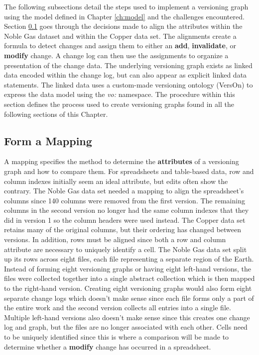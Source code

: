 The following subsections detail the steps used to implement a versioning graph using the model defined in Chapter \ref{ch:model} and the challenges encountered.
Section \ref{mapping} goes through the decisions made to align the attributes within the Noble Gas dataset and within the Copper data set.
The alignments create a formula to detect changes and assign them to either an \textbf{add}, \textbf{invalidate}, or \textbf{modify} change.
A change log can then use the assignments to organize a presentation of the change data.
The underlying versioning graph exists as linked data encoded within the change log, but can also appear as explicit linked data statements.
The linked data uses a custom-made versioning ontology (VersOn) to express the data model using the \textit{vo:} namespace.
The procedure within this section defines the process used to create versioning graphs found in all the following sections of this Chapter.

\subsection{Form a Mapping} \label{mapping}

A mapping specifies the method to determine the \textbf{attributes} of a versioning graph and how to compare them.
For spreadsheets and table-based data, row and column indexes initially seem an ideal attribute, but edits often show the contrary.
The Noble Gas data set needed a mapping to align the spreadsheet's columns since 140 columns were removed from the first version.
The remaining columns in the second version no longer had the same column indexes that they did in version 1 so the column headers were used instead.
The Copper data set retains many of the original columns, but their ordering has changed between versions.
In addition, rows must be aligned since both a row and column attribute are necessary to uniquely identify a cell.
The Noble Gas data set split up its rows across eight files, each file representing a separate region of the Earth.
Instead of forming eight versioning graphs or having eight left-hand versions, the files were collected together into a single abstract collection which is then mapped to the right-hand version.
Creating eight versioning graphs would also form eight separate change logs which doesn't make sense since each file forms only a part of the entire work and the second version collects all entries into a single file.
Multiple left-hand versions also doesn't make sense since this creates one change log and graph, but the files are no longer associated with each other.
Cells need to be uniquely identified since this is where a comparison will be made to determine whether a \textbf{modify} change has occurred in a spreadsheet.

